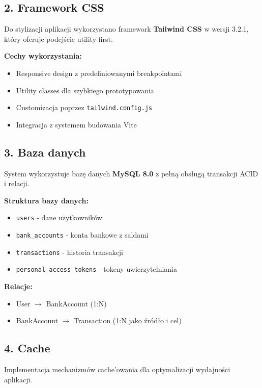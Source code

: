 \documentclass[12pt,a4paper]{article}
\begin{document}
    \subsection{2. Framework CSS}

    Do stylizacji aplikacji wykorzystano framework \textbf{Tailwind CSS} w wersji 3.2.1, który oferuje podejście utility-first.

    \textbf{Cechy wykorzystania:}
    \begin{itemize}
        \item Responsive design z predefiniowanymi breakpointami
        \item Utility classes dla szybkiego prototypowania
        \item Customizacja poprzez \texttt{tailwind.config.js}
        \item Integracja z systemem budowania Vite
    \end{itemize}

    \subsection{3. Baza danych}

    System wykorzystuje bazę danych \textbf{MySQL 8.0} z pełną obsługą transakcji ACID i relacji.

    \textbf{Struktura bazy danych:}
    \begin{itemize}
        \item \texttt{users} - dane użytkowników
        \item \texttt{bank\_accounts} - konta bankowe z saldami
        \item \texttt{transactions} - historia transakcji
        \item \texttt{personal\_access\_tokens} - tokeny uwierzytelniania
    \end{itemize}

    \textbf{Relacje:}
    \begin{itemize}
        \item User $\rightarrow$ BankAccount (1:N)
        \item BankAccount $\rightarrow$ Transaction (1:N jako źródło i cel)
    \end{itemize}

    \subsection{4. Cache}

    Implementacja mechanizmów cache'owania dla optymalizacji wydajności aplikacji.
\end{document}
